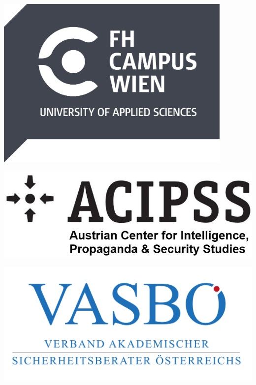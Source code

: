 \documentclass[a4paper,10pt]{article}
\begin{document}
\begin{minipage}[m]{0.28\textwidth}
\includegraphics[width=0.87\textwidth]{fh-campus.png}
\end{minipage}\hfill
\begin{minipage}[m]{0.33\textwidth}
\includegraphics[width=\textwidth]{acipss-schrift.JPG}
\end{minipage}\hfill\hspace{1em}
\begin{minipage}[m]{0.29\textwidth}
\includegraphics[width=\textwidth]{vasboe-transp.png}
\end{minipage}\hfill
\end{document}
